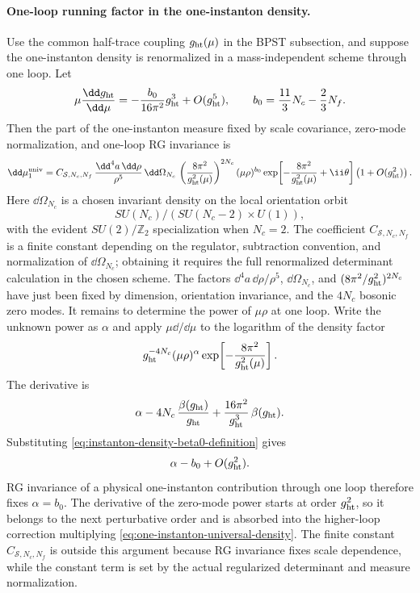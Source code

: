 \paragraph{One-loop running factor in the one-instanton density.}
Use the common half-trace coupling \(g_{\rm ht}(\mu)\) in the BPST
subsection, and suppose the one-instanton density is renormalized in a
mass-independent scheme through one loop.  Let
\begin{equation}
  \mu\frac{\dd g_{\rm ht}}{\dd\mu}
  =
  -\frac{b_0}{16\pi^2}g_{\rm ht}^3+O(g_{\rm ht}^5),
  \qquad
  b_0=\frac{11}{3}N_c-\frac23N_f .
  \label{eq:instanton-density-beta0-definition}
\end{equation}
Then the part of the one-instanton measure fixed by scale covariance,
zero-mode normalization, and one-loop RG invariance is
\begin{equation}
  \dd\mu_{1}^{\rm univ}
  =
  C_{\mathcal S,N_c,N_f}\,
  \frac{\dd^4a\,\dd\rho}{\rho^5}\,
  \dd\Omega_{N_c}\,
  \left(\frac{8\pi^2}{g_{\rm ht}^2(\mu)}\right)^{2N_c}
  (\mu\rho)^{b_0}
  \exp\!\left[-\frac{8\pi^2}{g_{\rm ht}^2(\mu)}+\ii\theta\right]
  \left(1+O(g_{\rm ht}^2)\right).
  \label{eq:one-instanton-universal-density}
\end{equation}
Here \(\dd\Omega_{N_c}\) is a chosen invariant density on the local
orientation orbit
\[
  SU(N_c)/(SU(N_c-2)\times U(1)),
\]
with the evident \(SU(2)/\mathbb Z_2\) specialization when \(N_c=2\).
The coefficient \(C_{\mathcal S,N_c,N_f}\) is a finite constant depending on
the regulator, subtraction convention, and normalization of
\(\dd\Omega_{N_c}\); obtaining it requires the full renormalized determinant
calculation in the chosen scheme.
The factors
\(\dd^4a\,\dd\rho/\rho^5\), \(\dd\Omega_{N_c}\), and
\((8\pi^2/g_{\rm ht}^2)^{2N_c}\) have just been fixed by dimension,
orientation invariance, and the \(4N_c\) bosonic zero modes.  It remains to
determine the power of \(\mu\rho\) at one loop.  Write the unknown power as
\(\alpha\) and apply \(\mu\dd/\dd\mu\) to the logarithm of the density factor
\[
  g_{\rm ht}^{-4N_c}
  (\mu\rho)^\alpha
  \exp\!\left[-\frac{8\pi^2}{g_{\rm ht}^2(\mu)}\right].
\]
The derivative is
\[
  \alpha
  -4N_c\,\frac{\beta(g_{\rm ht})}{g_{\rm ht}}
  +
  \frac{16\pi^2}{g_{\rm ht}^3}\,\beta(g_{\rm ht}) .
\]
Substituting \eqref{eq:instanton-density-beta0-definition} gives
\[
  \alpha-b_0+O(g_{\rm ht}^2).
\]
RG invariance of a physical one-instanton contribution through one loop
therefore fixes \(\alpha=b_0\).  The derivative of the zero-mode power
starts at order \(g_{\rm ht}^2\), so it belongs to the next perturbative order
and is absorbed into the higher-loop correction multiplying
\eqref{eq:one-instanton-universal-density}.  The finite constant
\(C_{\mathcal S,N_c,N_f}\) is outside this argument because RG invariance
fixes scale dependence, while the constant term is set by the actual
regularized determinant and measure normalization.


